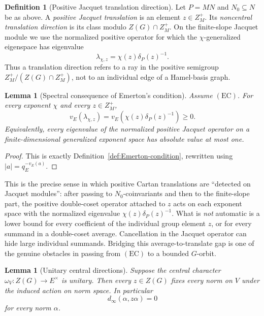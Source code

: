\documentclass[12pt]{article}
\newtheorem{lemma}[theorem]{Lemma}
\theoremstyle{definition}
\newtheorem{definition}[theorem]{Definition}
\theoremstyle{remark}
\begin{document}
\begin{definition}[Positive Jacquet translation direction]
\label{def:Jacquet-translation-direction}
Let $P=MN$ and $N_0\subseteq N$ be as above.  A \emph{positive Jacquet
translation} is an element $z\in Z_M^+$.  Its \emph{noncentral translation
direction} is its class modulo $Z(G)\cap Z_M^+$.  On the finite-slope
Jacquet module we use the normalized positive operator for which the
$\chi$-generalized eigenspace has eigenvalue
\[
 \lambda_{\chi,z}=\chi(z)\delta_P(z)^{-1}.
\]
Thus a translation direction refers to a ray in the positive semigroup
$Z_M^+/(Z(G)\cap Z_M^+)$, not to an individual edge of a Hamel-basis graph.
\end{definition}

\begin{lemma}[Spectral consequence of Emerton's condition]
\label{lem:EC-spectral-translation}
Assume $(\mathrm{EC})$.  For every exponent $\chi$ and every
$z\in Z_M^+$,
\[
 v_E\!\left(\lambda_{\chi,z}\right)
 =v_E\!\left(\chi(z)\delta_P(z)^{-1}\right)\geq0.
\]
Equivalently, every eigenvalue of the normalized positive Jacquet operator
on a finite-dimensional generalized exponent space has absolute value at
most one.
\end{lemma}

\begin{proof}
This is exactly Definition~\ref{def:Emerton-condition}, rewritten using
$|a|=q_E^{-v_E(a)}$.
\end{proof}

This is the precise sense in which positive Cartan translations are
``detected on Jacquet modules'': after passing to $N_0$-coinvariants and then
to the finite-slope part, the positive double-coset operator attached to
$z$ acts on each exponent space with the normalized eigenvalue
$\chi(z)\delta_P(z)^{-1}$.  What is \emph{not} automatic is a lower bound for
every coefficient of the individual group element $z$, or for every summand
in a double-coset average.  Cancellation in the Jacquet operator can hide
large individual summands.  Bridging this average-to-translate gap is one of
the genuine obstacles in passing from $(\mathrm{EC})$ to a bounded
$G$-orbit.

\begin{lemma}[Unitary central directions]
\label{lem:unitary-central-direction}
Suppose the central character $\omega_V:Z(G)\to E^\times$ is unitary.  Then
every $z\in Z(G)$ fixes every norm on $V$ under the induced action on norm
space.  In particular
\[
 d_\infty(\alpha,z\alpha)=0
\]
for every norm $\alpha$.
\end{lemma}
\end{document}
